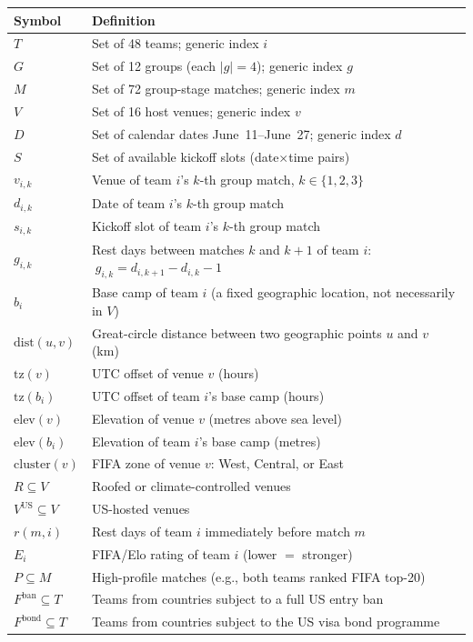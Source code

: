 \documentclass[12pt, letterpaper]{article}
\begin{document}
\begin{center}
\renewcommand{\arraystretch}{1.30}
\begin{tabular}{@{}lp{10cm}@{}}
\toprule
\textbf{Symbol} & \textbf{Definition} \\
\midrule
$T$ & Set of 48 teams; generic index $i$ \\
$G$ & Set of 12 groups (each $|g|=4$); generic index $g$ \\
$M$ & Set of 72 group-stage matches; generic index $m$ \\
$V$ & Set of 16 host venues; generic index $v$ \\
$D$ & Set of calendar dates June~11--June~27; generic index $d$ \\
$S$ & Set of available kickoff slots (date$\times$time pairs) \\
$v_{i,k}$ & Venue of team $i$'s $k$-th group match,
            $k\in\{1,2,3\}$ \\
$d_{i,k}$ & Date of team $i$'s $k$-th group match \\
$s_{i,k}$ & Kickoff slot of team $i$'s $k$-th group match \\
$g_{i,k}$ & Rest days between matches $k$ and $k{+}1$ of team $i$:
            $\;g_{i,k} = d_{i,k+1} - d_{i,k} - 1$ \\
$b_{i}$ & Base camp of team $i$ (a fixed geographic location,
          not necessarily in $V$) \\
$\mathrm{dist}(u,v)$ & Great-circle distance between two geographic
                       points $u$ and $v$ (km) \\
$\mathrm{tz}(v)$ & UTC offset of venue $v$ (hours) \\
$\mathrm{tz}(b_i)$ & UTC offset of team $i$'s base camp (hours) \\
$\mathrm{elev}(v)$ & Elevation of venue $v$ (metres above sea level) \\
$\mathrm{elev}(b_i)$ & Elevation of team $i$'s base camp (metres) \\
$\mathrm{cluster}(v)$ & FIFA zone of venue $v$: West, Central, or East \\
$R \subseteq V$ & Roofed or climate-controlled venues \\
$V^{\mathrm{US}} \subseteq V$ & US-hosted venues \\
$r(m,i)$ & Rest days of team $i$ immediately before match $m$ \\
$E_i$ & FIFA/Elo rating of team $i$ (lower $=$ stronger) \\
$P \subseteq M$ & High-profile matches (e.g., both teams ranked
                  FIFA top-20) \\
$F^{\mathrm{ban}} \subseteq T$ & Teams from countries subject to a
                                 full US entry ban \\
$F^{\mathrm{bond}} \subseteq T$ & Teams from countries subject to the
                                  US visa bond programme \\
\bottomrule
\end{tabular}
\end{center}
\end{document}
